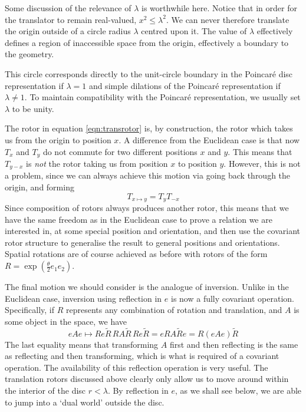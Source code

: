 Some discussion of the relevance of $\lambda$ is worthwhile here. Notice that
in order for the translator to remain real-valued, $x^2 \le \lambda^2$. 
We can never therefore translate the origin outside of a circle radius
$\lambda$ centred upon it. The value of $\lambda$ effectively defines
a region of inaccessible space from the origin, effectively a boundary to
the geometry.

This circle corresponds directly to the unit-circle boundary in the
Poincar\'e disc representation if $\lambda = 1$ and simple dilations of
the Poincar\'e representation if $\lambda \ne 1$. To maintain compatibility
with the Poincar\'e representation, we usually set $\lambda$ to be unity.

%
The rotor in equation \ref{eqn:transrotor} is, by construction, the rotor 
which takes us from
the origin to position $x$. A difference from the
Euclidean case is that now $T_x$ and $T_y$ do not commute
for two different positions $x$ and $y$. This means that
$T_{y-x}$ is {\em not\/} the rotor taking us from
position $x$ to position $y$. However, this is not a
problem, since we can always achieve this motion via
going back through the origin, and forming
%
\begin{equation}
T_{x \mapsto y} = T_y T_{-x}
\end{equation}
%
Since composition of rotors always produces another
rotor, this means that we have the same freedom as in the
Euclidean case to prove a relation we are interested in,
at some special position and orientation, and then use
the covariant rotor structure to generalise the result to
general positions and orientations. Spatial rotations are
of course achieved as before with rotors of the form
$R=\exp\left(\frac{\theta}{2}e_1 e_2\right)$.

The final motion we should consider is the analogue of
inversion. Unlike in the Euclidean case, inversion using
reflection in $e$ is now a fully covariant operation.
Specifically, if $R$ represents any combination of
rotation and translation, and $A$ is some object in the
space, we have
%
\begin{equation}
eAe \mapsto Re\tilde{R}\, RA\tilde{R}\, Re\tilde{R} = e
RA\tilde{R} e = R(eAe) \tilde{R}
\end{equation}
%
The last equality means that transforming $A$ first and
then reflecting is the same as reflecting and then
transforming, which is what is required of a covariant
operation. The availability of this reflection operation
is very useful. The translation rotors discussed above
clearly only allow us to move around within the interior
of the disc $r<\lambda$. By reflection in $e$, as we
shall see below, we are able to jump into a `dual world'
outside the disc.

